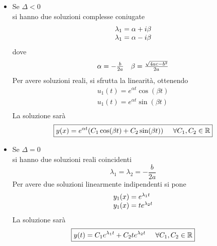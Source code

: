 \begin{itemize}
    \item Se $\Delta < 0$ \\
    si hanno due soluzioni complesse coniugate
    \[  \begin{array}{l l}
        \lambda_1 = \alpha + i \beta \\
        \lambda_1 = \alpha - i \beta 
    \end{array} \]
    dove \[ \begin{array}{l l} \alpha=-\frac{b}{2a} & \beta=\frac{\sqrt{4ac - b^2}}{2a} \end{array} \]
    Per avere soluzioni reali, si sfrutta la linearità, ottenendo
    \begin{equation}
        \begin{array}{l}
            u_1(t) = e^{\alpha t}\cos (\beta t) \\
            u_1(t) = e^{\alpha t}\sin (\beta t) \\
        \end{array}
    \end{equation}
    La soluzione sarà
    \begin{equation}
        \boxed{y(x) = e^{\alpha t}(C_1 \cos(\beta t) + C_2 \sin(\beta t) ) \mspace{25mu} \forall C_1, C_2 \in \mathbb{R}}
    \end{equation}
    \item Se $\Delta = 0$ \\
    si hanno due soluzioni reali coincidenti
    \[ \lambda_1 = \lambda_2 = -\frac{b}{2a}\]
    Per avere due soluzioni linearmente indipendenti si pone
    \begin{equation}
        \begin{array}{l l}
            y_1(x) = e^{\lambda_1 t} \\
            y_1(x) = t e^{\lambda_2 t} 
        \end{array} 
    \end{equation}
    La soluzione sarà
    \begin{equation}
        \boxed{y(t) = C_1 e^{\lambda_1 t} + C_2 t e^{\lambda_2 t} \mspace{25mu} \forall C_1, C_2 \in \mathbb{R}}
    \end{equation}
\end{itemize}